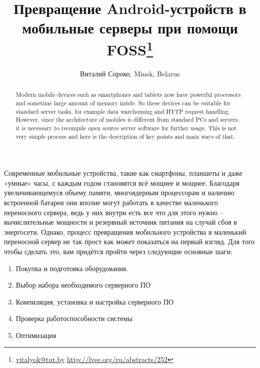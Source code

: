 \documentclass[10pt, a5paper]{article}
\begin{document}
\title{Превращение Android-устройств в мобильные серверы при помощи FOSS\footnote{\url{vitalyok@tut.by} \url{http://lvee.org/ru/abstracts/252}}}
\author{Виталий Сороко, Minsk, Belarus}
\maketitle
\begin{abstract}
Modern mobile devices such as smartphones and tablets now have powerful processors and sometime large amount of memory inside.  So these devices can be suitable for standard server tasks, for example data warehousing and HTTP request handling. However, since the architecture of mobiles is different from standard PCs and servers, it is necessary to recompile open source server software  for further usage. This is not very simple process and here is the description of key points and main ways of that.
\end{abstract}
Современные мобильные устройства, такие как смартфоны, планшеты и даже «умные» часы, с каждым годом становятся всё мощнее и мощнее. Благодаря увеличивающемуся объему памяти, многоядерным процессорам и наличию встроенной батареи они вполне могут работать в качестве маленького переносного сервера, ведь у них внутри есть все что для этого нужно – вычислительные мощности и резервный источник питания на случай сбоя в энергосети. Однако, процесс превращения мобильного устройства в маленький переносной сервер не так прост как может показаться на первый взгляд.  Для того чтобы сделать это, вам придётся пройти через следующие основные шаги:

\begin{enumerate}
  \item Покупка и подготовка оборудования.
  \item Выбор набора необходимого серверного ПО
  \item Компиляция, установка и настройка серверного ПО
  \item Проверка работоспособности системы
  \item Оптимизация
\end{enumerate}
\end{document}
